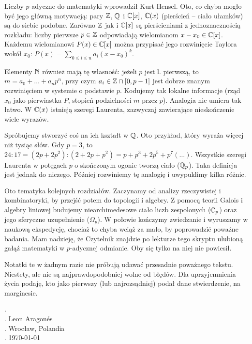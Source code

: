 Liczby $p$-adyczne do matematyki wprowadził Kurt Hensel.
Oto, co chyba mogło być jego główną motywacją: pary $\mathbb Z$, $\mathbb Q$ i $\mathbb C[x]$, $\mathbb C(x)$ (pierścień -- ciało ułamków) są do siebie podobne.
Zarówno $\mathbb Z$ jak i $\mathbb C[x]$ są pierścieniami z jednoznacznością rozkładu: liczby pierwsze $p \in \mathbb Z$ odpowiadają wielomianom $x - x_0 \in \mathbb C[x]$.
Każdemu wielomianowi $P(x) \in \mathbb C[x]$ można przypisać jego rozwinięcie Taylora wokół $x_0$: $P(x) = \sum_{0 \le i \le n} a_i (x - x_0)^k$.

Elementy $\mathbb N$ również mają tę własność: jeżeli $p$ jest l. pierwszą, to $m = a_0 + \ldots + a_n p^n$, przy czym $a_i \in \mathbb Z \cap [0, p-1]$ jest dobrze znanym rozwinięciem w systemie o podstawie $p$.
Kodujemy tak lokalne informacje (rząd $x_0$ jako pierwiastka $P$, stopień podzielności $m$ przez $p$).
Analogia nie umiera tak łatwo. 
W $\mathbb C(x)$ istnieją szeregi Laurenta, zazwyczaj zawierające nieskończenie wiele wyrazów.

Spróbujemy stworzyć coś na ich kształt w $\mathbb Q$.
Oto przykład, który wyraża więcej niż tysiąc słów.
Gdy $p = 3$, to $24 : 17 = (2p+2p^2) : (2+2p+p^2) = p + p^3 + 2p^5 + p^7(\ldots)$.
Wszystkie szeregi Laurenta w potęgach $p$ o skończonym ogonie tworzą ciało ($\mathbb Q_p$).
Taka definicja jest jednak do niczego.
Później rozwiniemy tę analogię i uwypuklimy kilka różnic.

Oto tematyka kolejnych rozdziałów.
Zaczynamy od analizy rzeczywistej i kombinatoryki, by przejść potem do topologii i algebry.
Z pomocą teorii Galois i algebry liniowej budujemy niearchimedesowe ciało liczb zespolonych ($\mathbb C_p$) oraz jego sferyczne uzupełnienie ($\Omega_p$).
W połowie kończymy zwiedzanie i wyruszamy w naukową ekspedycję, chociaż to chyba wciąż za mało, by poprowadzić poważne badania.
Mam nadzieję, że Czytelnik znajdzie po lekturze tego skryptu ulubioną gałąź matematyki w $p$-adycznej odmianie.
Oby się tylko na niej nie powiesił.

Notatki te w żadnym razie nie próbują udawać przesadnie poważnego tekstu.
Niestety, ale nie są najprawdopodobniej wolne od błędów.
Dla uprzyjemnienia życia podaję, kto jako pierwszy (lub najrozsądniej) podał dane stwierdzenie, na marginesie.

{\color{white}.} \hfill \\
{\color{white}.} \hfill Leon Aragonés\\
{\color{white}.} \hfill Wrocław, Polandia\\
{\color{white}.} \hfill \today

